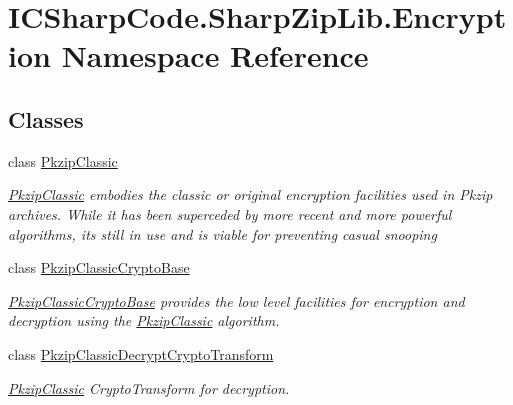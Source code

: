 \hypertarget{namespace_i_c_sharp_code_1_1_sharp_zip_lib_1_1_encryption}{}\section{I\+C\+Sharp\+Code.\+Sharp\+Zip\+Lib.\+Encryption Namespace Reference}
\label{namespace_i_c_sharp_code_1_1_sharp_zip_lib_1_1_encryption}
\subsection*{Classes}
\begin{DoxyCompactItemize}
\item 
class \hyperlink{class_i_c_sharp_code_1_1_sharp_zip_lib_1_1_encryption_1_1_pkzip_classic}{Pkzip\+Classic}
\begin{DoxyCompactList}\small\item\em \hyperlink{class_i_c_sharp_code_1_1_sharp_zip_lib_1_1_encryption_1_1_pkzip_classic}{Pkzip\+Classic} embodies the classic or original encryption facilities used in Pkzip archives. While it has been superceded by more recent and more powerful algorithms, its still in use and is viable for preventing casual snooping \end{DoxyCompactList}\item 
class \hyperlink{class_i_c_sharp_code_1_1_sharp_zip_lib_1_1_encryption_1_1_pkzip_classic_crypto_base}{Pkzip\+Classic\+Crypto\+Base}
\begin{DoxyCompactList}\small\item\em \hyperlink{class_i_c_sharp_code_1_1_sharp_zip_lib_1_1_encryption_1_1_pkzip_classic_crypto_base}{Pkzip\+Classic\+Crypto\+Base} provides the low level facilities for encryption and decryption using the \hyperlink{class_i_c_sharp_code_1_1_sharp_zip_lib_1_1_encryption_1_1_pkzip_classic}{Pkzip\+Classic} algorithm. \end{DoxyCompactList}\item 
class \hyperlink{class_i_c_sharp_code_1_1_sharp_zip_lib_1_1_encryption_1_1_pkzip_classic_decrypt_crypto_transform}{Pkzip\+Classic\+Decrypt\+Crypto\+Transform}
\begin{DoxyCompactList}\small\item\em \hyperlink{class_i_c_sharp_code_1_1_sharp_zip_lib_1_1_encryption_1_1_pkzip_classic}{Pkzip\+Classic} Crypto\+Transform for decryption. \end{DoxyCompactList}\item 

\end{DoxyCompactItemize}
